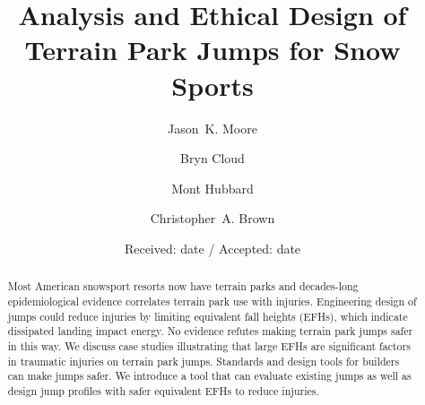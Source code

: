 \documentclass[smallextended]{svjour3}       %
\begin{document}
\title{Analysis and Ethical Design of Terrain Park Jumps for Snow Sports}

\author{
  Jason~K. Moore \and
  Bryn Cloud \and
  Mont Hubbard \and
  Christopher~A. Brown
}


\date{Received: date / Accepted: date}

\maketitle

\begin{abstract}
  Most American snowsport resorts now have terrain parks and decades-long
  epidemiological evidence correlates terrain park use with injuries.
  Engineering design of jumps could reduce injuries by limiting equivalent fall
  heights (EFHs), which indicate dissipated landing impact energy. No evidence
  refutes making terrain park jumps safer in this way. We discuss case studies
  illustrating that large EFHs are significant factors in traumatic injuries on
  terrain park jumps. Standards and design tools for builders can make jumps
  safer. We introduce a tool that can evaluate existing jumps as well as design
  jump profiles with safer equivalent EFHs to reduce injuries.
\end{abstract}
\end{document}
